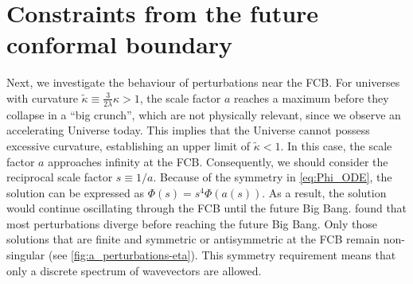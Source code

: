 \section{Constraints from the future conformal boundary}\label{sec:constrain_FCB}
Next, we investigate the behaviour of perturbations near the FCB.  For universes with curvature \( \tilde{\kappa} \equiv \frac{3}{2\lambda}\kappa > 1 \), the scale factor \(a\) reaches a maximum before they collapse in a ``big crunch'', which are not physically relevant, since we observe an accelerating Universe today. This implies that the Universe cannot possess excessive curvature, establishing an upper limit of \(\tilde{\kappa} < 1\). In this case, the scale factor \(a\) approaches infinity at the FCB.
Consequently, we should consider the reciprocal scale factor \( s \equiv 1/a \). Because of the symmetry in \cref{eq:Phi_ODE}, the solution can be expressed as \(\Phi(s)= s^4 \Phi(a(s)) \). As a result, the solution would continue oscillating through the FCB until the future Big Bang. \citet{2022PhRvD.105h3514L} found that most perturbations diverge before reaching the future Big Bang. Only those solutions that are finite and symmetric or antisymmetric at the FCB remain non-singular (see \cref{fig:a_perturbations-eta}). This symmetry requirement means that only a discrete spectrum of wavevectors are allowed.

